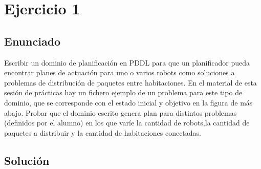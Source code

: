 \newpage %

\tableofcontents %

\listoffigures


\newpage




\section{Ejercicio 1}

\subsection{Enunciado}

Escribir un dominio de planificación en PDDL para que un planificador pueda encontrar planes  de  actuación  para  uno  o  varios  robots  como  soluciones  a  problemas  de distribución de paquetes entre habitaciones. En el material de esta sesión de prácticas hay un fichero ejemplo de un problema para este tipo de dominio, que se corresponde con el estado inicial y objetivo en la figura de más abajo. Probar que el dominio escrito genera  plan  para  distintos  problemas (definidos  por  el  alumno) en  los  que  varíe  la cantidad  de  robots,la  cantidad  de  paquetes  a  distribuir  y  la  cantidad  de  habitaciones conectadas.

\subsection{Solución}

